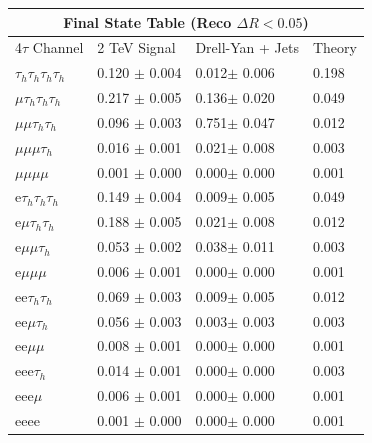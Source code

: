 \documentclass{article}
\begin{document}
 
\begin{landscape} 
\centering 
\begin{tabular}{|p{4.5cm}|p{3cm}|p{3cm}|p{3cm}|}\hline 
\multicolumn{4}{|c|}{Final State Table (Reco \(\Delta R < 0.05\))} \\ 
\hline 
4$\tau$ Channel & 2 TeV Signal & Drell-Yan + Jets & Theory \\ 
\hline 
$\tau_h$$\tau_h$$\tau_h$$\tau_h$ & 0.120 $\pm$ 0.004 & 0.012$\pm$ 0.006 & 0.198\\
\hline 
$\mu$$\tau_h$$\tau_h$$\tau_h$ & 0.217 $\pm$ 0.005 & 0.136$\pm$ 0.020 & 0.049\\
\hline 
$\mu$$\mu$$\tau_h$$\tau_h$ & 0.096 $\pm$ 0.003 & 0.751$\pm$ 0.047 & 0.012\\
\hline 
$\mu$$\mu$$\mu$$\tau_h$ & 0.016 $\pm$ 0.001 & 0.021$\pm$ 0.008 & 0.003\\
\hline 
$\mu$$\mu$$\mu$$\mu$ & 0.001 $\pm$ 0.000 & 0.000$\pm$ 0.000 & 0.001\\
\hline 
e$\tau_h$$\tau_h$$\tau_h$ & 0.149 $\pm$ 0.004 & 0.009$\pm$ 0.005 & 0.049\\
\hline 
e$\mu$$\tau_h$$\tau_h$ & 0.188 $\pm$ 0.005 & 0.021$\pm$ 0.008 & 0.012\\
\hline 
e$\mu$$\mu$$\tau_h$ & 0.053 $\pm$ 0.002 & 0.038$\pm$ 0.011 & 0.003\\
\hline 
e$\mu$$\mu$$\mu$ & 0.006 $\pm$ 0.001 & 0.000$\pm$ 0.000 & 0.001\\
\hline 
ee$\tau_h$$\tau_h$ & 0.069 $\pm$ 0.003 & 0.009$\pm$ 0.005 & 0.012\\
\hline 
ee$\mu$$\tau_h$ & 0.056 $\pm$ 0.003 & 0.003$\pm$ 0.003 & 0.003\\
\hline 
ee$\mu$$\mu$ & 0.008 $\pm$ 0.001 & 0.000$\pm$ 0.000 & 0.001\\
\hline 
eee$\tau_h$ & 0.014 $\pm$ 0.001 & 0.000$\pm$ 0.000 & 0.003\\
\hline 
eee$\mu$ & 0.006 $\pm$ 0.001 & 0.000$\pm$ 0.000 & 0.001\\
\hline 
eeee & 0.001 $\pm$ 0.000 & 0.000$\pm$ 0.000 & 0.001\\
\hline 
\end{tabular} 
\end{landscape} 
\end{document}
